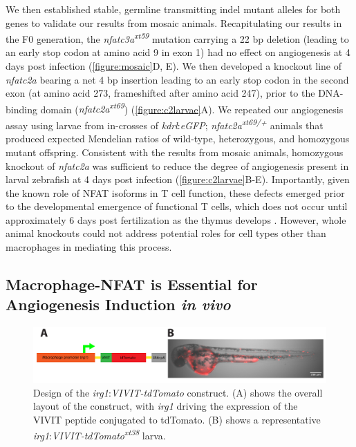 We then established stable, germline transmitting indel mutant alleles for both genes to validate our results from mosaic animals. Recapitulating our results in the F0 generation, the \textit{nfatc3a\textsuperscript{xt59}} mutation carrying a 22 bp deletion (leading to an early stop codon at amino acid 9 in exon 1) had no effect on angiogenesis at 4 days post infection (\autoref{figure:mosaic}D, E). We then developed a knockout line of \textit{nfatc2a} bearing a net 4 bp insertion leading to an early stop codon in the second exon (at amino acid 273, frameshifted after amino acid 247), prior to the DNA-binding domain (\textit{nfatc2a\textsuperscript{xt69}}) (\autoref{figure:c2larvae}A). We repeated our angiogenesis assay using larvae from in-crosses of \textit{kdrl}:\textit{eGFP}; \textit{nfatc2a\textsuperscript{xt69/+}} animals that produced expected Mendelian ratios of wild-type, heterozygous, and homozygous mutant offspring. Consistent with the results from mosaic animals, homozygous knockout of \textit{nfatc2a} was sufficient to reduce the degree of angiogenesis present in larval zebrafish at 4 days post infection (\autoref{figure:c2larvae}B-E). Importantly, given the known role of NFAT isoforms in T cell function, these defects emerged prior to the developmental emergence of functional T cells, which does not occur until approximately 6 days post fertilization as the thymus develops \citep{Trede2004}. However, whole animal knockouts could not address potential roles for cell types other than macrophages in mediating this process. 

\subsection{Macrophage-NFAT is Essential for Angiogenesis Induction \textit{in vivo}}

\begin{figure}
\centering
\includegraphics[width=\textwidth]{images/vivitconstruct.pdf}
\caption{Design of the \textit{irg1}:\textit{VIVIT-tdTomato} construct. (A) shows the overall layout of the construct, with \textit{irg1} driving the expression of the VIVIT peptide conjugated to tdTomato. (B) shows a representative \textit{irg1}:\textit{VIVIT-tdTomato\textsuperscript{xt38}} larva.}
\label{figure:vivitdiagram}
\end{figure}

